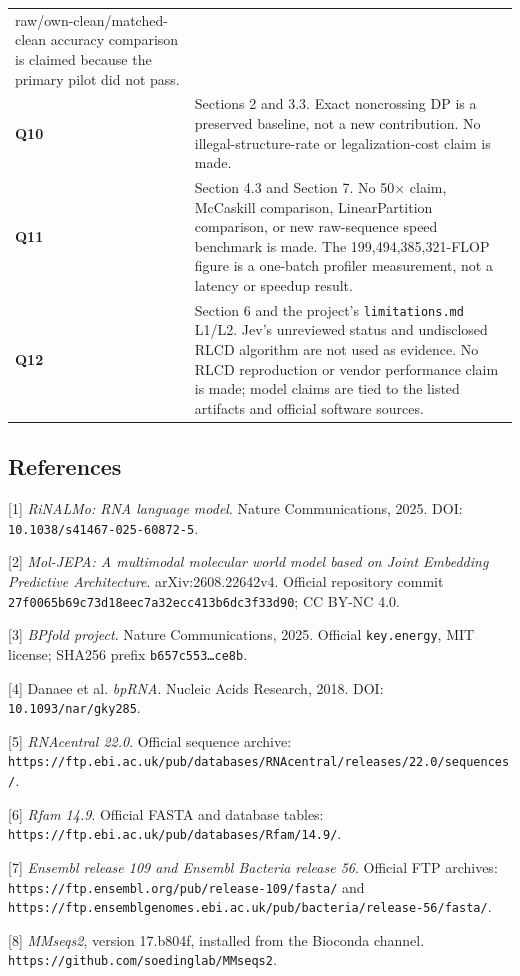 \documentclass[
  11pt]{article}
\begin{document}
\begin{longtable}[]{@{}ll@{}}
raw/own-clean/matched-clean accuracy comparison is claimed because the
primary pilot did not pass. \\
\textbf{Q10} & Sections 2 and 3.3. Exact noncrossing DP is a preserved
baseline, not a new contribution. No illegal-structure-rate or
legalization-cost claim is made. \\
\textbf{Q11} & Section 4.3 and Section 7. No 50× claim, McCaskill
comparison, LinearPartition comparison, or new raw-sequence speed
benchmark is made. The 199,494,385,321-FLOP figure is a one-batch
profiler measurement, not a latency or speedup result. \\
\textbf{Q12} & Section 6 and the project's \texttt{limitations.md}
L1/L2. Jev's unreviewed status and undisclosed RLCD algorithm are not
used as evidence. No RLCD reproduction or vendor performance claim is
made; model claims are tied to the listed artifacts and official
software sources. \\
\bottomrule
\end{longtable}

\hypertarget{references}{%
\subsection{References}\label{references}}

{[}1{]} \emph{RiNALMo: RNA language model}. Nature Communications, 2025.
DOI: \texttt{10.1038/s41467-025-60872-5}.

{[}2{]} \emph{Mol-JEPA: A multimodal molecular world model based on
Joint Embedding Predictive Architecture}. arXiv:2608.22642v4. Official
repository commit \texttt{27f0065b69c73d18eec7a32ecc413b6dc3f33d90}; CC
BY-NC 4.0.

{[}3{]} \emph{BPfold project}. Nature Communications, 2025. Official
\texttt{key.energy}, MIT license; SHA256 prefix
\texttt{b657c553\ldots{}ce8b}.

{[}4{]} Danaee et al. \emph{bpRNA}. Nucleic Acids Research, 2018. DOI:
\texttt{10.1093/nar/gky285}.

{[}5{]} \emph{RNAcentral 22.0}. Official sequence archive:
\texttt{https://ftp.ebi.ac.uk/pub/databases/RNAcentral/releases/22.0/sequences/}.

{[}6{]} \emph{Rfam 14.9}. Official FASTA and database tables:
\texttt{https://ftp.ebi.ac.uk/pub/databases/Rfam/14.9/}.

{[}7{]} \emph{Ensembl release 109 and Ensembl Bacteria release 56}.
Official FTP archives:
\texttt{https://ftp.ensembl.org/pub/release-109/fasta/} and
\texttt{https://ftp.ensemblgenomes.ebi.ac.uk/pub/bacteria/release-56/fasta/}.

{[}8{]} \emph{MMseqs2}, version 17.b804f, installed from the Bioconda
channel. \texttt{https://github.com/soedinglab/MMseqs2}.
\end{document}
